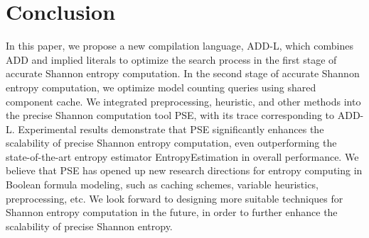 \section{Conclusion}
\label{sec:Conclusion}

In this paper, we propose a new compilation language, ADD-L, which combines ADD and implied literals to optimize the search process in the first stage of accurate Shannon entropy computation. 
In the second stage of accurate Shannon entropy computation, we optimize model counting queries using shared component cache.
We integrated preprocessing, heuristic, and other methods into the precise Shannon computation tool PSE, with its trace corresponding to ADD-L. 
Experimental results demonstrate that PSE significantly enhances the scalability of precise Shannon entropy computation, even outperforming the state-of-the-art entropy estimator EntropyEstimation in overall performance.
We believe that PSE has opened up new research directions for entropy computing in Boolean formula modeling, such as caching schemes, variable heuristics, preprocessing, etc.
We look forward to designing more suitable techniques for Shannon entropy computation in the future, in order to further enhance the scalability of precise Shannon entropy.